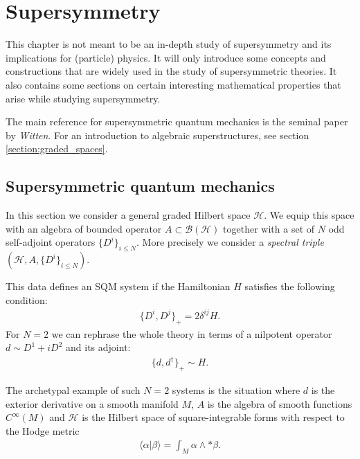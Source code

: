 \chapter{Supersymmetry}

    This chapter is not meant to be an in-depth study of supersymmetry and its implications for (particle) physics. It will only introduce some concepts and constructions that are widely used in the study of supersymmetric theories. It also contains some sections on certain interesting mathematical properties that arise while studying supersymmetry.

    The main reference for supersymmetric quantum mechanics is the seminal paper \cite{witten_morse} by \textit{Witten}. For an introduction to algebraic superstructures, see section \ref{section:graded_spaces}.

\section{Supersymmetric quantum mechanics}

    In this section we consider a general graded Hilbert space $\mathcal{H}$. We equip this space with an algebra of bounded operator $A\subset\mathcal{B}(\mathcal{H})$ together with a set of $N$ odd self-adjoint operators $\{D^i\}_{i\leq N}$. More precisely we consider a \textit{spectral triple} $(\mathcal{H}, A, \{D^i\}_{i\leq N})$.

    This data defines an SQM system if the Hamiltonian $H$ satisfies the following condition:
    \begin{gather}
        \{D^i, D^j\}_+ = 2\delta^{ij}H.
    \end{gather}
    For $N=2$ we can rephrase the whole theory in terms of a nilpotent operator $d\sim D^1+iD^2$ and its adjoint:
    \begin{gather}
        \{d, d^\dagger\}_+\sim H.
    \end{gather}

    \begin{example}
        The archetypal example of such $N=2$ systems is the situation where $d$ is the exterior derivative on a smooth manifold $M$, $A$ is the algebra of smooth functions $C^\infty(M)$ and $\mathcal{H}$ is the Hilbert space of square-integrable forms with respect to the Hodge metric
        \begin{gather}
            \langle\alpha|\beta\rangle = \int_M\alpha\wedge\ast\beta.
        \end{gather}
    \end{example}

